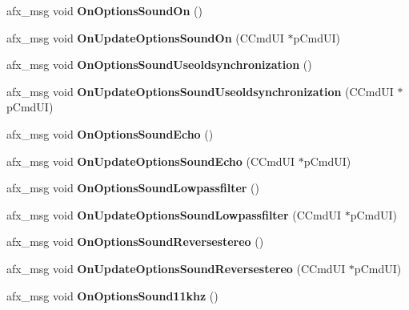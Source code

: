 \begin{DoxyCompactItemize}
afx\+\_\+msg void {\bfseries On\+Options\+Sound\+On} ()
\item 
\mbox{\label{class_main_wnd_a116f77e43b912bb2fcf33d746294882f}} 
afx\+\_\+msg void {\bfseries On\+Update\+Options\+Sound\+On} (C\+Cmd\+UI $\ast$p\+Cmd\+UI)
\item 
\mbox{\label{class_main_wnd_a58f33cfb8f434804b45d391e7a9a9427}} 
afx\+\_\+msg void {\bfseries On\+Options\+Sound\+Useoldsynchronization} ()
\item 
\mbox{\label{class_main_wnd_ad409c739ea2f37ff73e079067d75d2e5}} 
afx\+\_\+msg void {\bfseries On\+Update\+Options\+Sound\+Useoldsynchronization} (C\+Cmd\+UI $\ast$p\+Cmd\+UI)
\item 
\mbox{\label{class_main_wnd_a8b2ccc9d323d27e0b748e0e03c544537}} 
afx\+\_\+msg void {\bfseries On\+Options\+Sound\+Echo} ()
\item 
\mbox{\label{class_main_wnd_a9b5182cec889a64c08fdd74638ef5fd9}} 
afx\+\_\+msg void {\bfseries On\+Update\+Options\+Sound\+Echo} (C\+Cmd\+UI $\ast$p\+Cmd\+UI)
\item 
\mbox{\label{class_main_wnd_ae0615da70b0d8ad601287b6d78f3d100}} 
afx\+\_\+msg void {\bfseries On\+Options\+Sound\+Lowpassfilter} ()
\item 
\mbox{\label{class_main_wnd_a3dce17aef080623fbfb5b044b0602cd1}} 
afx\+\_\+msg void {\bfseries On\+Update\+Options\+Sound\+Lowpassfilter} (C\+Cmd\+UI $\ast$p\+Cmd\+UI)
\item 
\mbox{\label{class_main_wnd_a17ac28c79cacf19d1f02925b8c8ea6e3}} 
afx\+\_\+msg void {\bfseries On\+Options\+Sound\+Reversestereo} ()
\item 
\mbox{\label{class_main_wnd_aa8de36d9ebca9c8080800573464ee464}} 
afx\+\_\+msg void {\bfseries On\+Update\+Options\+Sound\+Reversestereo} (C\+Cmd\+UI $\ast$p\+Cmd\+UI)
\item 
\mbox{\label{class_main_wnd_a8e81270ba800c278c27501dcf4ac7cf0}} 
afx\+\_\+msg void {\bfseries On\+Options\+Sound11khz} ()

\end{DoxyCompactItemize}
